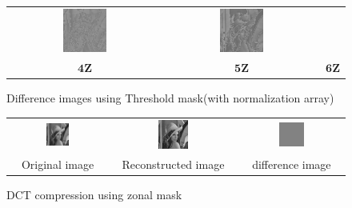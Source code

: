 \documentclass[11pt,a4paper]{article}
\begin{document}
\begin{figure}[!htbp]
\begin{tabular}{ccc}
		\includegraphics[width=0.3\textwidth]{pro7/dct/8_31_e_diff}&
		\includegraphics[width=0.3\textwidth]{pro7/dct/8_31_f_diff}\\
		$\mathbf{4Z}$& $\mathbf{5Z}$ & $\mathbf{6Z}$
	\end{tabular}
	\caption{Difference images using Threshold mask(with normalization array)}
	\label{pro7_fig3}
\end{figure}

\begin{figure}[!htbp]
	\centering
	\begin{tabular}{ccc} 
		\includegraphics[width=0.25\textwidth]{pro7/origin}&
		\includegraphics[width=0.25\textwidth]{pro7/dct/zonal}&
		\includegraphics[width=0.25\textwidth]{pro7/dct/zonal_diff}\\
		 Original image& Reconstructed image & difference image
	\end{tabular}
	\caption{DCT compression using zonal mask}
	\label{pro7_fig1}
\end{figure}
\end{document}
